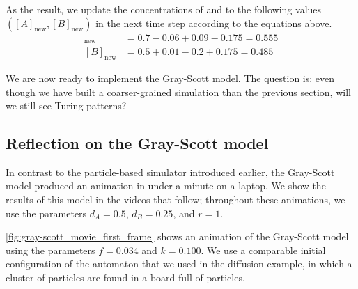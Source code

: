 As the result, we update the concentrations of  and  to the following values $([A]_{\text{new}}, [B]_{\text{new}})$ in the next time step according to the equations above.
\begin{align*}
[A]_{\text{new}} & = 0.7 - 0.06 + 0.09 - 0.175 = 0.555\\
[B]_{\text{new}} & = 0.5 + 0.01 - 0.2 + 0.175 = 0.485
\end{align*}

We are now ready to implement the Gray-Scott model. The question is: even though we have built a coarser-grained simulation than the previous section, will we still see Turing patterns?

\FloatBarrier
{}
\subsection{Reflection on the Gray-Scott model}

In contrast to the particle-based simulator introduced earlier, the Gray-Scott model produced an animation in under a minute on a laptop. We show the results of this model in the videos that follow; throughout these animations, we use the parameters $d_A = 0.5$, $d_B = 0.25$, and $r = 1$.

\autoref{fig:gray-scott_movie_first_frame} shows an animation of the Gray-Scott model using the parameters  $f = 0.034$ and $k = 0.100$. We use a comparable initial configuration of the automaton that we used in the diffusion example, in which a cluster of  particles are found in a board full of  particles.\\

